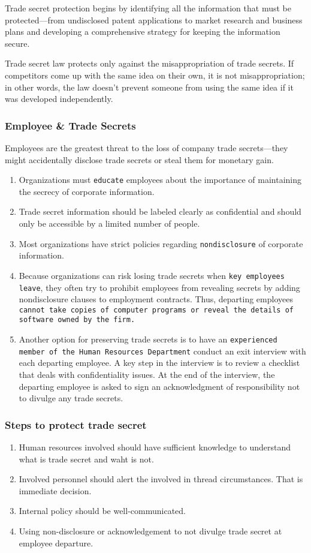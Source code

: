 \documentclass[11pt]{article}
\begin{document}
Trade secret protection begins by identifying all the information that must be protected—from undisclosed patent applications to market research and business plans and developing a comprehensive strategy for keeping the information secure. 

Trade secret law protects only against the misappropriation of trade secrets. If competitors come up with the same idea on their own, it is not misappropriation; in other words, the law doesn’t prevent someone from using the same idea if it was developed independently.
\subsubsection{Employee \& Trade Secrets}
\label{sec:orgd79b243}
Employees are the greatest threat to the loss of company trade secrets—they might accidentally disclose trade secrets or steal them for monetary gain.

\begin{enumerate}
\item Organizations must \texttt{educate} employees about the importance of maintaining the secrecy of corporate information.
\item Trade secret information should be labeled clearly as confidential and should only be accessible by a limited number of people.
\item Most organizations have strict policies regarding \texttt{nondisclosure} of corporate information.
\item Because organizations can risk losing trade secrets when \texttt{key employees leave}, they often try to prohibit employees from revealing secrets by adding nondisclosure clauses to employment contracts. Thus, departing employees \texttt{cannot take copies of computer programs or reveal the details of software owned by the firm.}
\item Another option for preserving trade secrets is to have an \texttt{experienced member of the Human Resources Department} conduct an exit interview with each departing employee. A key step in the interview is to review a checklist that deals with confidentiality issues. At the end of the interview, the departing employee is asked to sign an acknowledgment of responsibility not to divulge any trade secrets.
\end{enumerate}
\subsubsection{Steps to protect trade secret}
\label{sec:org116d6c0}
\begin{enumerate}
\item Human resources involved should have sufficient knowledge to understand what is trade secret and waht is not.
\item Involved personnel should alert the involved in thread circumstances. That is immediate decision.
\item Internal policy should be well-communicated.
\item Using non-disclosure or acknowledgement to not divulge trade secret at employee departure.
\end{enumerate}
\end{document}

